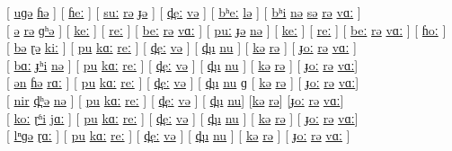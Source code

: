 \documentclass[17pt]{extarticle}
\begin{document}
[ \underline{uɡə} \underline{ɦə} ] [ \underline{ɦeː} ] [ \underline{suː} \underline{rə} \underline{ɟə} ] [ \underline{d̪eː} \underline{və} ] [ \underline{bʰeː} \underline{lə} ] [ \underline{bʰi} \underline{nə} \underline{sə} \underline{rə} \underline{vɑː} ]\\

[ \underline{ə} \underline{rə} \underline{ɡʰə} ] [ \underline{keː} ] [ \underline{reː} ] [ \underline{beː} \underline{rə} \underline{vɑː} ] [ \underline{puː} \underline{ɟə} \underline{nə} ] [ \underline{keː} ] [ \underline{reː} ] [ \underline{beː} \underline{rə} \underline{vɑː} ] [ \underline{ɦoː} ] \\

[ \underline{bə} \underline{ɽə} \underline{kiː} ] [ \underline{pu} \underline{kɑː} \underline{reː} ] [ \underline{d̪eː} \underline{və} ] [ \underline{d̪u} \underline{nu} ] [ \underline{kə} \underline{rə} ] [ \underline{ɟoː} \underline{rə} \underline{vɑː} ] \\

[ \underline{bɑː} \underline{ɟʰi} \underline{nə} ] [ \underline{pu} \underline{kɑː} \underline{reː} ] [ \underline{d̪eː} \underline{və} ] [ \underline{d̪u} \underline{nu} ] [ \underline{kə} \underline{rə} ] [ \underline{ɟoː} \underline{rə} \underline{vɑː}]\\

[ \underline{ən} \underline{ɦə} \underline{rɑː} ] [ \underline{pu} \underline{kɑː} \underline{reː} ] [ \underline{d̪eː} \underline{və} ] [ \underline{d̪u} \underline{nu} ɡ [ \underline{kə} \underline{rə} ] [ \underline{ɟoː} \underline{rə} \underline{vɑː}]\\

[ \underline{nir} \underline{d̪ʰə} \underline{nə} ] [ \underline{pu} \underline{kɑː} \underline{reː} ] [ \underline{d̪eː} \underline{və} ] [
\underline{d̪u} \underline{nu}] [\underline{kə} \underline{rə}] [\underline{ɟoː} \underline{rə} \underline{vɑː}]\\

[ \underline{koː} \underline{ɽʱi} \underline{jɑː} ] [ \underline{pu} \underline{kɑː} \underline{reː} ] [ \underline{d̪eː} \underline{və} ] [ \underline{d̪u} \underline{nu} ] [ \underline{kə} \underline{rə} ] [ \underline{ɟoː} \underline{rə} \underline{vɑː}]\\

[ \underline{lⁿɡə} \underline{ɽɑː} ] [ \underline{pu} \underline{kɑː} \underline{reː} ] [ \underline{d̪eː} \underline{və} ] [ \underline{d̪u} \underline{nu} ] [ \underline{kə} \underline{rə} ] [ \underline{ɟoː} \underline{rə} \underline{vɑː} ]\\
\end{document}
